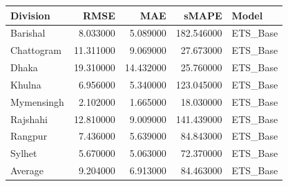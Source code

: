 \begin{tabular}{lrrrl}
\toprule
Division & RMSE & MAE & sMAPE & Model \\
\midrule
Barishal & 8.033000 & 5.089000 & 182.546000 & ETS_Base \\
Chattogram & 11.311000 & 9.069000 & 27.673000 & ETS_Base \\
Dhaka & 19.310000 & 14.432000 & 25.760000 & ETS_Base \\
Khulna & 6.956000 & 5.340000 & 123.045000 & ETS_Base \\
Mymensingh & 2.102000 & 1.665000 & 18.030000 & ETS_Base \\
Rajshahi & 12.810000 & 9.009000 & 141.439000 & ETS_Base \\
Rangpur & 7.436000 & 5.639000 & 84.843000 & ETS_Base \\
Sylhet & 5.670000 & 5.063000 & 72.370000 & ETS_Base \\
Average & 9.204000 & 6.913000 & 84.463000 & ETS_Base \\
\bottomrule
\end{tabular}

